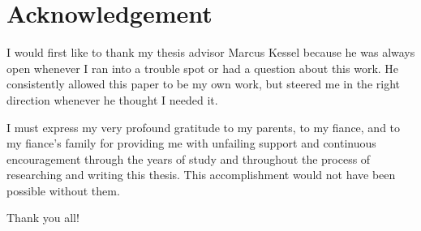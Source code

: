 \chapter*{Acknowledgement}
I would first like to thank my thesis advisor Marcus Kessel because he was always open whenever I ran into a trouble spot or had a question about this work. He consistently allowed this paper to be my own work, but steered me in the right direction whenever he thought I needed it.

I must express my very profound gratitude to my parents, to my fiance, and to my fiance's family for providing me with unfailing support and continuous encouragement through the years of study and throughout the process of researching and writing this thesis. This accomplishment would not have been possible without them. 

Thank you all!